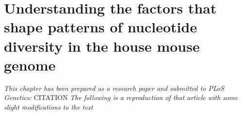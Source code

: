 \chapter{Understanding the factors that shape patterns of nucleotide diversity in the house mouse genome}

\emph{This chapter has been prepared as a research paper and submitted to PLoS Genetics:}
CITATION
\emph{The following is a reproduction of that article with some slight modifications to the text}
